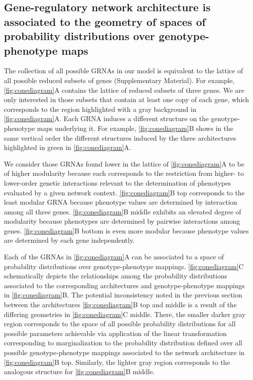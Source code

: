 \subsection{Gene-regulatory network architecture is associated to the geometry of spaces of probability distributions over genotype-phenotype maps}
The collection of all possible GRNAs in our model is equivalent to the lattice of all possible reduced subsets of genes (Supplementary Material). For example, \ref{fig:conediagram}A contains the lattice of reduced subsets of three genes. We are only interested in those subsets that contain at least one copy of each gene, which corresponds to the region highlighted with a gray background in \ref{fig:conediagram}A. Each GRNA induces a different structure on the genotype-phenotype maps underlying it. For example, \ref{fig:conediagram}B shows in the same vertical order the different structures induced by the three architectures highlighted in green in \ref{fig:conediagram}A.

We consider those GRNAs found lower in the lattice of \ref{fig:conediagram}A to be of higher modularity because each corresponds to the restriction from higher- to lower-order genetic interactions relevant to the determination of phenotypes evaluated by a given network context. \ref{fig:conediagram}B top corresponds to the least modular GRNA because phenotype values are determined by interaction among all three genes. \ref{fig:conediagram}B middle exhibits an elevated degree of modularity because phenotypes are determined by pairwise interactions among genes. \ref{fig:conediagram}B bottom is even more modular because phenotype values are determined by each gene independently.

Each of the GRNAs in \ref{fig:conediagram}A can be associated to a space of probability distributions over genotype-phenotype mappings. \ref{fig:conediagram}C schematically depicts the relationships among the probability distributions associated to the corresponding architectures and genotype-phenotype mappings in \ref{fig:conediagram}B. The potential inconsistency noted in the previous section between the architectures \ref{fig:conediagram}B top and middle is a result of the differing geometries in \ref{fig:conediagram}C middle. There, the smaller darker gray region corresponds to the space of all possible probability distributions for all possible parameters achievable via application of the linear transformation corresponding to marginalization to the probability distribution defined over all possible genotype-phenotype mappings associated to the network architecture in \ref{fig:conediagram}B top. Similarly, the lighter gray region corresponds to the analogous structure for \ref{fig:conediagram}B middle.

